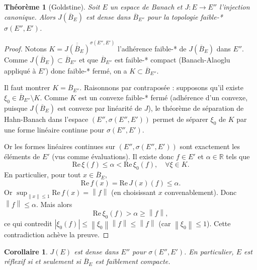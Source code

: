 \documentclass[a4paper,12pt]{book}
\newcommand{\R}{\mathbb{R}}
\newcommand{\norm}[1]{\left\| #1 \right\|}
\newcommand{\abs}[1]{\left| #1 \right|}
\theoremstyle{definition}
\theoremstyle{plain}
\newtheorem{theoreme}[definition]{Théorème}
\newtheorem{corollaire}[definition]{Corollaire}
\theoremstyle{remark}
\begin{document}

\begin{theoreme}[Goldstine]
\label{thm:goldstine}
Soit $E$ un espace de Banach et $J : E \to E''$ l'injection canonique. Alors
$J(\overline{B}_E)$ est dense dans $\overline{B}_{E''}$ pour la topologie
faible-* $\sigma(E'', E')$.
\end{theoreme}

\begin{proof}
Notons $K = \overline{J(\overline{B}_E)}^{\sigma(E'',E')}$ l'adhérence faible-*
de $J(\overline{B}_E)$ dans $E''$. Comme $J(\overline{B}_E) \subset \overline{B}_{E''}$
et que $\overline{B}_{E''}$ est faible-* compact (Banach-Alaoglu appliqué à $E'$)
donc faible-* fermé, on a $K \subset \overline{B}_{E''}$.

Il faut montrer $K = \overline{B}_{E''}$. Raisonnons par contraposée : supposons
qu'il existe $\xi_0 \in \overline{B}_{E''} \setminus K$. Comme $K$ est un convexe
faible-* fermé (adhérence d'un convexe, puisque
$J(\overline{B}_E)$ est convexe par linéarité de $J$), le théorème de séparation
de Hahn-Banach dans l'espace
$(E'', \sigma(E'',E'))$ permet de séparer $\xi_0$ de $K$ par une forme linéaire
continue pour $\sigma(E'',E')$.

Or les formes linéaires continues sur $(E'', \sigma(E'',E'))$ sont exactement les
éléments de $E'$ (vus comme évaluations). Il existe donc $f \in E'$ et $\alpha \in \R$
tels que
\[
  \mathrm{Re}\, \xi(f) \le \alpha < \mathrm{Re}\, \xi_0(f), \quad \forall \xi \in K.
\]
En particulier, pour tout $x \in \overline{B}_E$,
\[
  \mathrm{Re}\, f(x) = \mathrm{Re}\, J(x)(f) \le \alpha.
\]
Or $\sup_{\norm{x} \le 1} \mathrm{Re}\, f(x) = \norm{f}$
(en choisissant $x$ convenablement). Donc $\norm{f} \le \alpha$. Mais alors
\[
  \mathrm{Re}\, \xi_0(f) > \alpha \ge \norm{f},
\]
ce qui contredit $\abs{\xi_0(f)} \le \norm{\xi_0} \norm{f} \le \norm{f}$
(car $\norm{\xi_0} \le 1$). Cette contradiction achève la preuve.
\end{proof}

\begin{corollaire}
\label{cor:goldstine-dense}
$J(E)$ est dense dans $E''$ pour $\sigma(E'', E')$. En particulier, $E$ est réflexif
si et seulement si $\overline{B}_E$ est faiblement compacte.
\end{corollaire}
\end{document}
